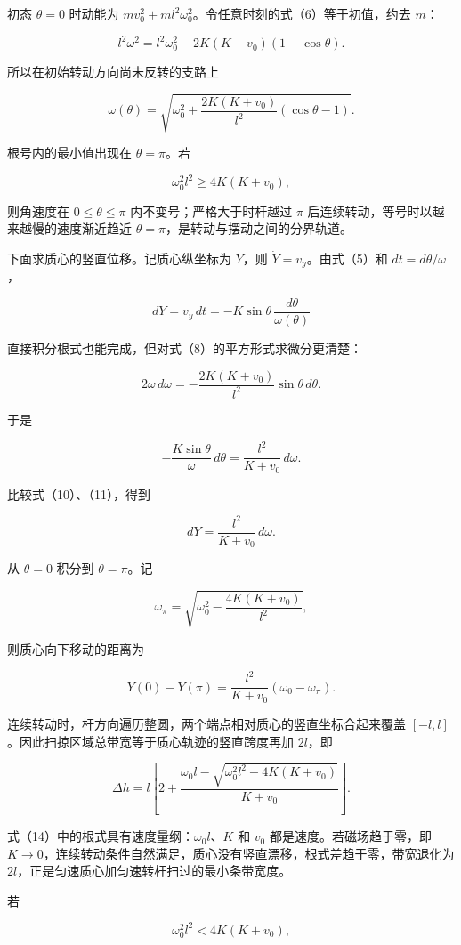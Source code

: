 \documentclass[12pt,a4paper,UTF8]{ctexart}
\begin{document}
初态 \(\theta=0\) 时动能为
\(mv_0^2+ml^2\omega_0^2\)。令任意时刻的式（6）等于初值，约去 \(m\)：

\[
l^2\omega^2
=l^2\omega_0^2-2K(K+v_0)(1-\cos\theta).
\]

所以在初始转动方向尚未反转的支路上

\[
\boxed{
\omega(\theta)=
\sqrt{
\omega_0^2+
\frac{2K(K+v_0)}{l^2}(\cos\theta-1)
}
}.
\tag{8}
\]

根号内的最小值出现在 \(\theta=\pi\)。若

\[
\omega_0^2l^2\ge4K(K+v_0),
\tag{9}
\]

则角速度在 \(0\le\theta\le\pi\) 内不变号；严格大于时杆越过 \(\pi\)
后连续转动，等号时以越来越慢的速度渐近趋近
\(\theta=\pi\)，是转动与摆动之间的分界轨道。

下面求质心的竖直位移。记质心纵坐标为 \(Y\)，则
\(\dot Y=v_y\)。由式（5）和 \(dt=d\theta/\omega\)，

\[
dY=v_y\,dt
=-K\sin\theta\,\frac{d\theta}{\omega(\theta)}
\tag{10}
\]

直接积分根式也能完成，但对式（8）的平方形式求微分更清楚：

\[
2\omega\,d\omega
=-\frac{2K(K+v_0)}{l^2}\sin\theta\,d\theta.
\]

于是

\[
-\frac{K\sin\theta}{\omega}\,d\theta
=\frac{l^2}{K+v_0}\,d\omega.
\tag{11}
\]

比较式（10）、（11），得到

\[
dY=\frac{l^2}{K+v_0}\,d\omega.
\tag{12}
\]

从 \(\theta=0\) 积分到 \(\theta=\pi\)。记

\[
\omega_\pi
=\sqrt{\omega_0^2-\frac{4K(K+v_0)}{l^2}},
\]

则质心向下移动的距离为

\[
Y(0)-Y(\pi)
=\frac{l^2}{K+v_0}(\omega_0-\omega_\pi).
\tag{13}
\]

连续转动时，杆方向遍历整圆，两个端点相对质心的竖直坐标合起来覆盖
\([-l,l]\)。因此扫掠区域总带宽等于质心轨迹的竖直跨度再加 \(2l\)，即

\[
\boxed{
\Delta h
=l\left[
2+\frac{\omega_0l-
\sqrt{\omega_0^2l^2-4K(K+v_0)}}
{K+v_0}
\right]
}.
\tag{14}
\]

式（14）中的根式具有速度量纲：\(\omega_0l\)、\(K\) 和 \(v_0\)
都是速度。若磁场趋于零，即
\(K\to0\)，连续转动条件自然满足，质心没有竖直漂移，根式差趋于零，带宽退化为
\(2l\)，正是匀速质心加匀速转杆扫过的最小条带宽度。

若

\[
\omega_0^2l^2<4K(K+v_0),
\tag{15}
\]
\end{document}

